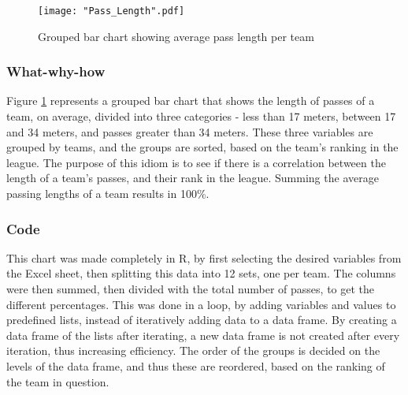 \documentclass[Report.tex]{subfiles}
\begin{document}
\begin{figure}
\center
\texttt{[image: "Pass\_Length".pdf]}
\caption{Grouped bar chart showing average pass length per team}
\label{Fig:Pass_Length}
\end{figure}



\subsubsection{What-why-how}
Figure \ref{Fig:Pass_Length} represents a grouped bar chart that shows the length of passes of a team, on average,
divided into three categories - less than 17 meters, between 17 and 34 meters,
and passes greater than 34 meters. These three variables are grouped by teams,
and the groups are sorted, based on the team's ranking in the league.
The purpose of this idiom is to see if there is a correlation between the length
of a team's passes, and their rank in the league.
Summing the average passing lengths of a team results in 100\%. 

\subsubsection{Code}
This chart was made completely in R, by first selecting the desired variables
from the Excel sheet, then splitting this data into 12 sets, one per team. 
The columns were then summed, then divided with the total number of passes, to
get the different percentages. This was done in a loop, by adding variables and
values to predefined lists, instead of iteratively adding data to a data frame. 
By creating a data frame of the lists after iterating,
a new data frame is not created after every iteration, thus increasing
efficiency.
The order of the groups is decided on the levels of the data frame, and
thus these are reordered, based on the ranking of the team in question.
\end{document}
